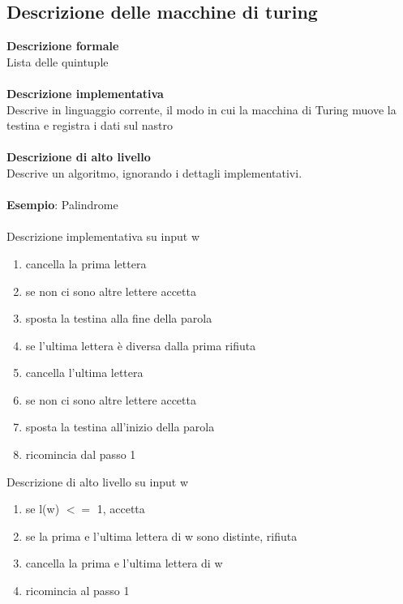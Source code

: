\subsection{Descrizione delle macchine di turing}
\textbf{Descrizione formale}\\
Lista delle quintuple\\\\
\textbf{Descrizione implementativa}\\
Descrive in linguaggio corrente, il modo in cui la macchina di Turing muove la testina e registra i dati sul nastro\\\\
\textbf{Descrizione di alto livello}\\
Descrive un algoritmo, ignorando i dettagli implementativi.\\\\
\textbf{Esempio}: Palindrome\\\\
Descrizione implementativa su input w
\begin{enumerate}
    \item cancella la prima lettera
    
    \item se non ci sono altre lettere accetta
    
    \item sposta la testina alla fine della parola
    
    \item se l’ultima lettera è diversa dalla prima rifiuta
    
    \item cancella l’ultima lettera
    
    \item se non ci sono altre lettere accetta
    
    \item sposta la testina all’inizio della parola
    
    \item ricomincia dal passo 1
\end{enumerate}
Descrizione di alto livello su input w
\begin{enumerate}
    \item se l(w) $<=$ 1, accetta
    
    \item se la prima e l’ultima lettera di w sono distinte, rifiuta
    
    \item cancella la prima e l’ultima lettera di w
    
    \item ricomincia al passo 1
\end{enumerate}
